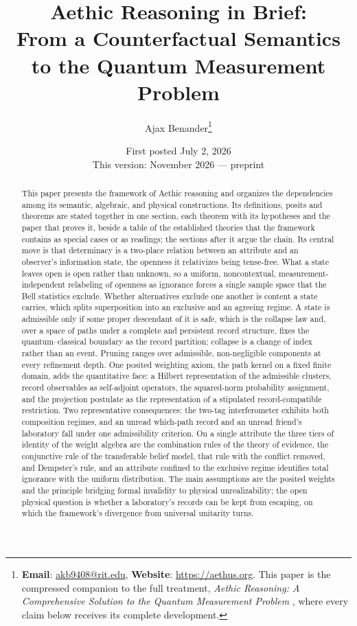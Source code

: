\documentclass[11pt]{article}
\title{Aethic Reasoning in Brief:\\[0.1em] \large From a Counterfactual Semantics to the Quantum Measurement Problem}
\author{Ajax Benander\thanks{\textbf{Email}: \href{mailto:akb9408@rit.edu}{akb9408@rit.edu}, \textbf{Website}: \url{https://aethus.org}. This paper is the compressed companion to the full treatment, \textit{Aethic Reasoning: A Comprehensive Solution to the Quantum Measurement Problem} \cite{Aethus}, where every claim below receives its complete development.}}
\date{First posted July 2, 2026\\ {\small This version: November 2026 --- preprint}}
\theoremstyle{definition}
\begin{document}
\maketitle\vspace{-0.75cm}

\begin{abstract}
\noindent This paper presents the framework of Aethic reasoning and organizes the dependencies among its semantic, algebraic, and physical constructions. Its definitions, posits and theorems are stated together in one section, each theorem with its hypotheses and the paper that proves it, beside a table of the established theories that the framework contains as special cases or as readings; the sections after it argue the chain. Its central move is that determinacy is a two-place relation between an attribute and an observer's information state, the openness it relativizes being tense-free. What a state leaves open is open rather than unknown, so a uniform, noncontextual, measurement-independent relabeling of openness as ignorance forces a single sample space that the Bell statistics exclude. Whether alternatives exclude one another is content a state carries, which splits superposition into an exclusive and an agreeing regime. A state is admissible only if some proper descendant of it is safe, which is the collapse law and, over a space of paths under a complete and persistent record structure, fixes the quantum--classical boundary as the record partition; collapse is a change of index rather than an event. Pruning ranges over admissible, non-negligible components at every refinement depth. One posited weighting axiom, the path kernel on a fixed finite domain, adds the quantitative face: a Hilbert representation of the admissible clusters, record observables as self-adjoint operators, the squared-norm probability assignment, and the projection postulate as the representation of a stipulated record-compatible restriction. Two representative consequences: the two-tag interferometer exhibits both composition regimes, and an unread which-path record and an unread friend's laboratory fall under one admissibility criterion. On a single attribute the three tiers of identity of the weight algebra are the combination rules of the theory of evidence, the conjunctive rule of the transferable belief model, that rule with the conflict removed, and Dempster's rule, and an attribute confined to the exclusive regime identifies total ignorance with the uniform distribution. The main assumptions are the posited weights and the principle bridging formal invalidity to physical unrealizability; the open physical question is whether a laboratory's records can be kept from escaping, on which the framework's divergence from universal unitarity turns.

\end{abstract}
\end{document}
